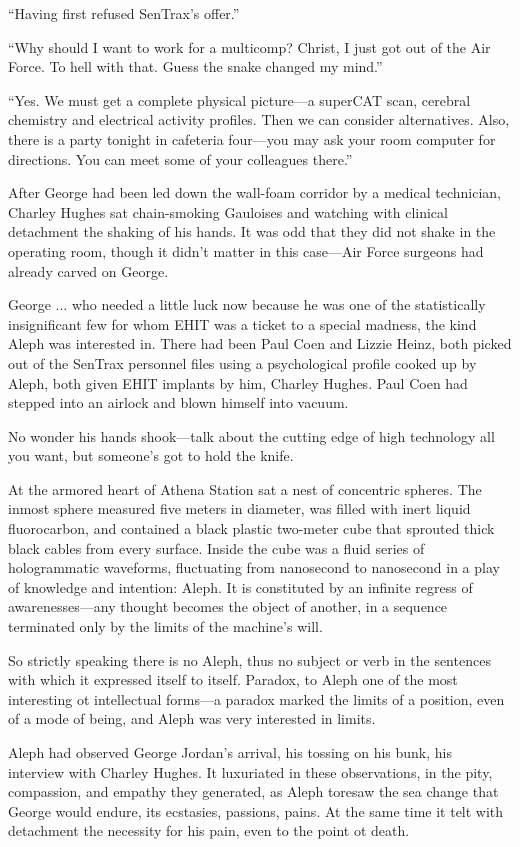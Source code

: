 ``Having first refused SenTrax's offer.''

``Why should I want to work for a multicomp? Christ, I just got out of the Air Force. To hell with that. Guess the snake changed my mind.''

``Yes. We must get a complete physical picture—a superCAT scan, cerebral chemistry and electrical activity profiles. Then we can consider alternatives. Also, there is a party tonight in cafeteria four---you may ask your room computer for directions. You can meet some of your colleagues there.''

After George had been led down the wall-foam corridor by a medical technician, Charley Hughes sat chain-smoking Gauloises and watching with clinical detachment the shaking of his hands. It was odd that they did not shake in the operating room, though it didn't matter in this case---Air Force surgeons had already carved on George.

George ... who needed a little luck now because he was one of the statistically insignificant few for whom EHIT was a ticket to a special madness, the kind Aleph was interested in. There had been Paul Coen and Lizzie Heinz, both picked out of the SenTrax personnel files using a psychological profile cooked up by Aleph, both given EHIT implants by him, Charley Hughes. Paul Coen had stepped into an airlock and blown himself into vacuum.

No wonder his hands shook—talk about the cutting edge of high technology all you want, but someone's got to hold the knife.

At the armored heart of Athena Station sat a nest of concentric spheres. The inmost sphere measured five meters in diameter, was filled with inert liquid fluorocarbon, and contained a black plastic two-meter cube that sprouted thick black cables from every surface. Inside the cube was a fluid series of hologrammatic waveforms, fluctuating from nanosecond to nanosecond in a play of knowledge and intention: Aleph. It is constituted by an infinite regress of awarenesses—any thought becomes the object of another, in a sequence terminated only by the limits of the machine's will.

So strictly speaking there is no Aleph, thus no subject or verb in the sentences with which it expressed itself to itself. Paradox, to Aleph one of the most interesting ot intellectual forms—a paradox marked the limits of a position, even of a mode of being, and Aleph was very interested in limits.

Aleph had observed George Jordan's arrival, his tossing on his bunk, his interview with Charley Hughes. It luxuriated in these observations, in the pity, compassion, and empathy they generated, as Aleph toresaw the sea change that George would endure, its ecstasies, passions, pains. At the same time it telt with detachment the necessity for his pain, even to the point ot death.

